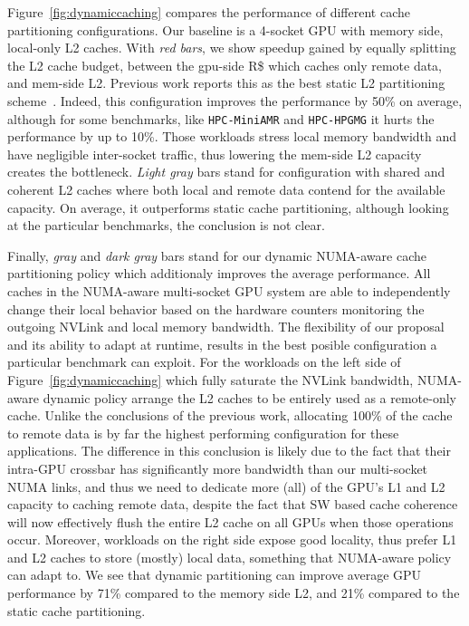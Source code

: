 Figure~\ref{fig:dynamiccaching} compares the performance of different cache partitioning configurations. Our baseline is a 4-socket GPU with memory side, local-only L2 caches. With \emph{red bars}, we show speedup gained by equally splitting the L2 cache budget, between the gpu-side R\$ which caches only remote data, and mem-side L2. Previous work reports this as the best static L2 partitioning scheme~\cite{Arunkumar2017}. Indeed, this configuration improves the performance by 50\% on average, although for some benchmarks, like \texttt{HPC-MiniAMR} and \texttt{HPC-HPGMG} it hurts the performance by up to 10\%. Those workloads stress local memory bandwidth and have negligible inter-socket traffic, thus lowering the mem-side L2 capacity creates the bottleneck. \emph{Light gray} bars stand for configuration with shared and coherent L2 caches where both local and remote data contend for the available capacity. On average, it outperforms static cache partitioning, although looking at the particular benchmarks, the conclusion is not clear.

Finally, \emph{gray} and \emph{dark gray} bars stand for our dynamic NUMA-aware cache partitioning policy which additionaly improves the average performance. All caches in the NUMA-aware multi-socket GPU system are able to independently change their local behavior based on the hardware counters monitoring the outgoing NVLink and local memory bandwidth. The flexibility of our proposal and its ability to adapt at runtime, results in the best posible configuration a particular benchmark can exploit. For the workloads on the left side of Figure~\ref{fig:dynamiccaching} which fully saturate the NVLink bandwidth, NUMA-aware dynamic policy arrange the L2 caches to be entirely used as a remote-only cache. Unlike the conclusions
of the previous work, allocating 100\% of the cache to remote data is by far the highest performing configuration for these applications.
The difference in this conclusion is likely due to the fact that their intra-GPU
crossbar has significantly more bandwidth than our multi-socket NUMA links, and thus
we need to dedicate more (all) of the GPU's L1 and L2 capacity to caching remote data, despite
the fact that SW based cache coherence will now effectively flush the entire L2 cache
on all GPUs when those operations occur. Moreover, workloads on the right side expose good locality, thus prefer L1 and L2 caches to store (mostly) local data, something that NUMA-aware policy can adapt to. We see that dynamic partitioning can improve average GPU performance by 71\% compared to the memory side L2, and 21\% compared to the static cache partitioning. 

